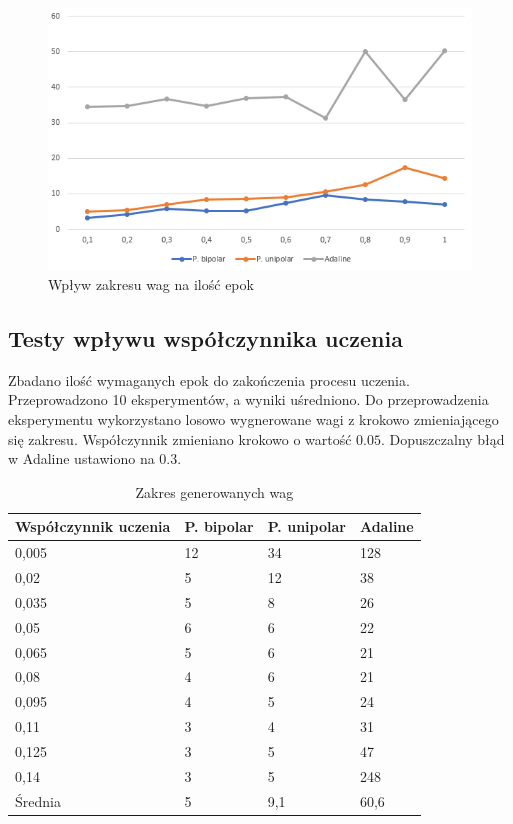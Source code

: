 \documentclass{article}
\begin{document}
\begin{figure}[h]
  \centering
  \includegraphics[width=\linewidth]{weights.png}
  \caption{Wpływ zakresu wag na ilość epok}
\end{figure}

\newpage
\subsection{ Testy wpływu współczynnika uczenia }

Zbadano ilość wymaganych epok do zakończenia procesu uczenia. Przeprowadzono 10 eksperymentów, a wyniki uśredniono.
Do przeprowadzenia eksperymentu wykorzystano losowo wygnerowane wagi z krokowo zmieniającego się zakresu.
Współczynnik zmieniano krokowo o wartość $0.05$.
Dopuszczalny błąd w Adaline ustawiono na $0.3$.

\begin{table}[h]
  \centering
    
  \bgroup
  \def\arraystretch{1.3}
  \begin{tabular}{|l|l|l|l|}
  \hline
  Współczynnik uczenia & P. bipolar & P. unipolar & Adaline  \\ \hline
  0,005 & 12 & 34 & 128 \\ \hline
  0,02 & 5 & 12 & 38 \\ \hline
  0,035 & 5 & 8 & 26 \\ \hline
  0,05 & 6 & 6 & 22 \\ \hline
  0,065 & 5 & 6 & 21 \\ \hline
  0,08 & 4 & 6 & 21 \\ \hline
  0,095 & 4 & 5 & 24 \\ \hline
  0,11 & 3 & 4 & 31 \\ \hline
  0,125 & 3 & 5 & 47 \\ \hline
  0,14 & 3 & 5 & 248 \\ \hline
  Średnia & 5 & 9,1 & 60,6 \\ \hline
  \end{tabular}
  \egroup
  \vspace{10px}
  \caption{Zakres generowanych wag}
\end{table}
\end{document}
